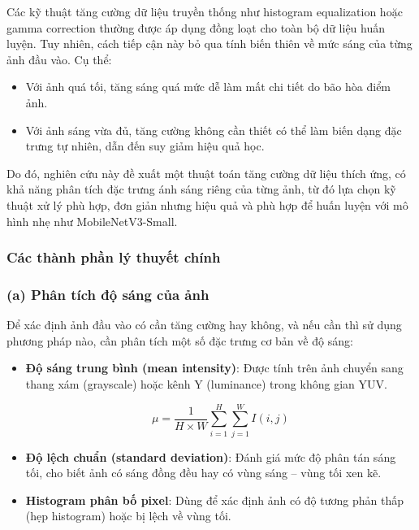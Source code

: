 Các kỹ thuật tăng cường dữ liệu truyền thống như histogram equalization hoặc gamma correction thường được áp dụng đồng loạt cho toàn bộ dữ liệu huấn luyện. Tuy nhiên, cách tiếp cận này bỏ qua tính biến thiên về mức sáng của từng ảnh đầu vào. Cụ thể:
\begin{itemize}[]
    \item Với ảnh quá tối, tăng sáng quá mức dễ làm mất chi tiết do bão hòa điểm ảnh.
    \item Với ảnh sáng vừa đủ, tăng cường không cần thiết có thể làm biến dạng đặc trưng tự nhiên, dẫn đến suy giảm hiệu quả học.
\end{itemize}

Do đó, nghiên cứu này đề xuất một thuật toán tăng cường dữ liệu thích ứng, có khả năng phân tích đặc trưng ánh sáng riêng của từng ảnh, từ đó lựa chọn kỹ thuật xử lý phù hợp, đơn giản nhưng hiệu quả và phù hợp để huấn luyện với mô hình nhẹ như MobileNetV3-Small.

\subsubsection{Các thành phần lý thuyết chính} %
\subsubsection*{(a) Phân tích độ sáng của ảnh}

Để xác định ảnh đầu vào có cần tăng cường hay không, và nếu cần thì sử dụng phương pháp nào, cần phân tích một số đặc trưng cơ bản về độ sáng:


\begin{itemize}[]
    \item \textbf{Độ sáng trung bình (mean intensity)}: Được tính trên ảnh chuyển sang thang xám (grayscale) hoặc kênh Y (luminance) trong không gian YUV.
    
    \[ \mu = \frac{1}{H \times W} \sum_{i=1}^{H} \sum_{j=1}^{W} I(i,j) \]
    
    \item \textbf{Độ lệch chuẩn (standard deviation)}: Đánh giá mức độ phân tán sáng tối, cho biết ảnh có sáng đồng đều hay có vùng sáng -- vùng tối xen kẽ.
    \item \textbf{Histogram phân bố pixel}: Dùng để xác định ảnh có độ tương phản thấp (hẹp histogram) hoặc bị lệch về vùng tối.
\end{itemize}

